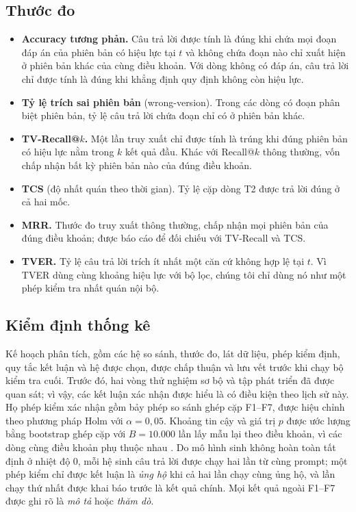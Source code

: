 \documentclass[11pt,a4paper]{article}
\begin{document}
\subsection{Thước đo}
\begin{itemize}
  \item \textbf{Accuracy tương phản.} Câu trả lời được tính là đúng khi chứa mọi đoạn đáp án của phiên bản có hiệu lực tại $t$ và không chứa đoạn nào chỉ xuất hiện ở phiên bản khác của cùng điều khoản. Với dòng không có đáp án, câu trả lời chỉ được tính là đúng khi khẳng định quy định không còn hiệu lực.
  \item \textbf{Tỷ lệ trích sai phiên bản} (wrong-version). Trong các dòng có đoạn phân biệt phiên bản, tỷ lệ câu trả lời chứa đoạn chỉ có ở phiên bản khác.
  \item \textbf{TV-Recall@$k$.} Một lần truy xuất chỉ được tính là trúng khi đúng phiên bản có hiệu lực nằm trong $k$ kết quả đầu. Khác với Recall@$k$ thông thường, vốn chấp nhận bất kỳ phiên bản nào của đúng điều khoản.
  \item \textbf{TCS} (độ nhất quán theo thời gian). Tỷ lệ cặp dòng T2 được trả lời đúng ở cả hai mốc.
  \item \textbf{MRR.} Thước đo truy xuất thông thường, chấp nhận mọi phiên bản của đúng điều khoản; được báo cáo để đối chiếu với TV-Recall và TCS.
  \item \textbf{TVER.} Tỷ lệ câu trả lời trích ít nhất một căn cứ không hợp lệ tại $t$. Vì TVER dùng cùng khoảng hiệu lực với bộ lọc, chúng tôi chỉ dùng nó như một phép kiểm tra nhất quán nội bộ.
\end{itemize}

\subsection{Kiểm định thống kê}
Kế hoạch phân tích, gồm các hệ so sánh, thước đo, lát dữ liệu, phép kiểm định, quy tắc kết luận và hệ được chọn, được chấp thuận và lưu vết trước khi chạy bộ kiểm tra cuối. Trước đó, hai vòng thử nghiệm sơ bộ và tập phát triển đã được quan sát; vì vậy, các kết luận xác nhận được hiểu là có điều kiện theo lịch sử này. Họ phép kiểm xác nhận gồm bảy phép so sánh ghép cặp F1--F7, được hiệu chỉnh theo phương pháp Holm \citep{holm1979} với $\alpha=0{,}05$. Khoảng tin cậy và giá trị $p$ được ước lượng bằng bootstrap ghép cặp với $B=10.000$ lần lấy mẫu lại theo điều khoản, vì các dòng cùng điều khoản phụ thuộc nhau \citep{dror2018hitchhiker}. Do mô hình sinh không hoàn toàn tất định ở nhiệt độ 0, mỗi hệ sinh câu trả lời được chạy hai lần từ cùng prompt; một phép kiểm chỉ được kết luận là \emph{ủng hộ} khi cả hai lần chạy cùng ủng hộ, và lần chạy thứ nhất được khai báo trước là kết quả chính. Mọi kết quả ngoài F1--F7 được ghi rõ là \emph{mô tả} hoặc \emph{thăm dò}.
\end{document}
